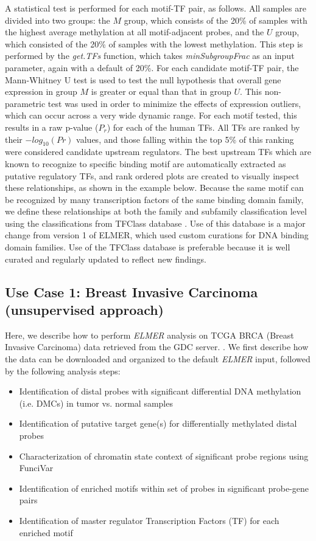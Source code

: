 A statistical test is performed for each motif-TF pair, as follows. All samples 
are divided into two groups: the $M$ group, which consists 
of the 20\% of samples with the highest average methylation at all motif-adjacent
probes, and the $U$ group, which consisted of the 20\%  of samples with the lowest 
methylation. This step is performed by the \textit{get.TFs} function, which takes \textit{minSubgroupFrac} as an input parameter, again with a default of 20\%.
For each candidate motif-TF pair, the Mann-Whitney U test is used to test 
the null hypothesis that overall gene expression in group $M$ is greater or equal 
than that in group $U$. This non-parametric test was used in order to minimize the 
effects of expression outliers, which can occur across a very wide dynamic range. 
For each motif tested, this results in a raw p-value ($P_r$) for each of the human TFs.
All TFs are ranked by their $-log_{10}(Pr)$ values, and those falling within the top 5\% of 
this ranking were considered candidate upstream regulators. The best upstream 
TFs which are known to recognize to specific binding motif are automatically extracted as putative 
regulatory TFs, and rank ordered plots are created to visually inspect these relationships, as shown in the example below. Because the same motif can be recognized by many transcription factors of the same binding domain family, we define these relationships at both the family and subfamily classification level using the 
classifications from TFClass database \cite{wingender2013tfclass}. Use of this database is a major change from version 1 of ELMER, which used custom curations for DNA binding domain families. Use of the TFClass database is preferable because it is well curated and regularly updated to reflect new findings.



\subsection{Use Case 1: Breast Invasive Carcinoma (unsupervised approach)} %

Here, we describe how to perform \textit{ELMER} analysis on TCGA BRCA (Breast Invasive Carcinoma) data retrieved from the GDC server. . We first describe how the data can be downloaded and organized to the default \textit{ELMER} input, followed by the following analysis steps: 
\begin{itemize}
	\item Identification of distal probes with significant differential DNA methylation (i.e. DMCs) in tumor vs. normal samples 
	\item Identification of putative target gene(s) for differentially methylated distal probes
    \item Characterization of chromatin state context of significant probe regions using FunciVar 
	\item Identification of enriched motifs within set of probes in significant probe-gene pairs
	\item Identification of master regulator Transcription Factors (TF) for each enriched motif
\end{itemize}

